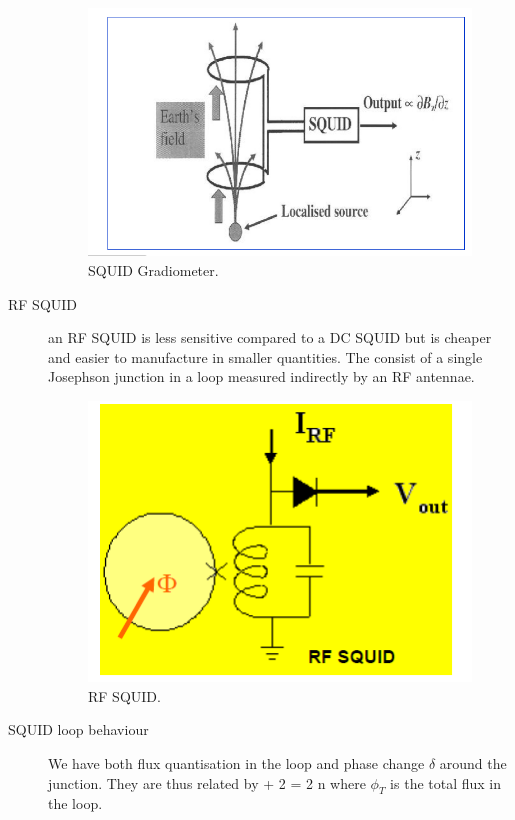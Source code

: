 \begin{description}
\begin{figure}[h]
  \caption{SQUID Gradiometer.}
  \centering
    \includegraphics[width=\textwidth]{./SC_figures/SQUID_Gradiometer.PNG}
\end{figure}


\item[RF SQUID] an RF SQUID is less sensitive compared to a DC SQUID but is cheaper and easier to manufacture in smaller quantities. The consist of a single Josephson junction in a loop measured indirectly by an RF antennae. 


\begin{figure}[h]
  \caption{RF SQUID.}
  \centering
    \includegraphics[width=\textwidth]{./SC_figures/RF_SQUID.PNG}
\end{figure}

\item[SQUID loop behaviour] We have both flux quantisation in the loop and phase change $\delta $ around the junction. They are thus related by 
\beq
\delta  + 2 \pi {} = 2 n \pi
\eeq
where $\phi_T$ is the total flux in the loop. 


\end{description}
